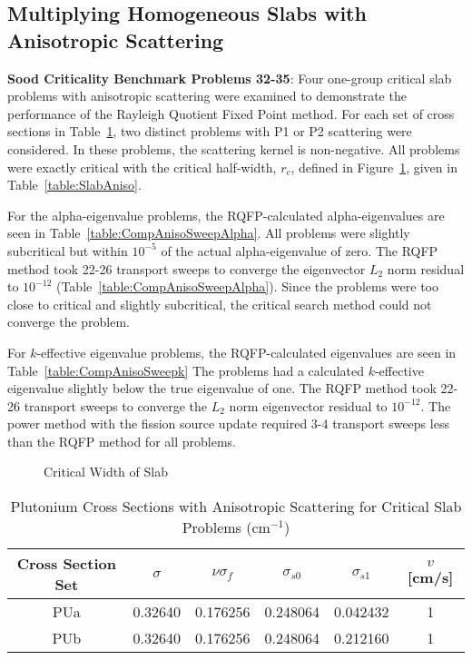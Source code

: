 \subsection{Multiplying Homogeneous Slabs with Anisotropic Scattering}

\textbf{Sood Criticality Benchmark Problems 32-35}: Four one-group critical slab problems with anisotropic scattering were examined to demonstrate the performance of the Rayleigh Quotient Fixed Point method. For each set of cross sections in Table~\ref{table:SoodPUAniso}, two distinct problems with P1 or P2 scattering were considered. In these problems, the scattering kernel is non-negative. All problems were exactly critical with the critical half-width, $r_{c}$, defined in Figure~\ref{fig:SlabCritWidth}, given in Table~\ref{table:SlabAniso}.

For the alpha-eigenvalue problems, the RQFP-calculated alpha-eigenvalues are seen in Table~\ref{table:CompAnisoSweepAlpha}. All problems were slightly subcritical but within $10^{-5}$ of the actual alpha-eigenvalue of zero. The RQFP method took 22-26 transport sweeps to converge the eigenvector $L_{2}$ norm residual to $10^{-12}$ (Table~\ref{table:CompAnisoSweepAlpha}). Since the problems were too close to critical and slightly subcritical, the critical search method could not converge the problem.

For $k$-effective eigenvalue problems, the RQFP-calculated eigenvalues are seen in Table~\ref{table:CompAnisoSweepk} The problems had a calculated $k$-effective eigenvalue slightly below the true eigenvalue of one. The RQFP method took 22-26 transport sweeps to converge the $L_{2}$ norm eigenvector residual to $10^{-12}$. The power method with the fission source update required 3-4 transport sweeps less than the RQFP method for all problems.

\begin{figure}[!htbp]
	\centering
	
	\caption{Critical Width of Slab}
	\label{fig:SlabCritWidth}
\end{figure}

\begin{table}[!htbp]
	\caption{Plutonium Cross Sections with Anisotropic Scattering for Critical Slab Problems (cm$^{-1}$) \cite{sood2003analytical}}
	\label{table:SoodPUAniso}
	\centering{}
    \begin{tabular}{*6c}
        \toprule
	Cross Section Set & $\sigma$ & $\nu \sigma_{f}$ & $\sigma_{s0}$  & $\sigma_{s1}$ & $v$ [cm/s] \\ 
        \midrule
	PUa & 0.32640 & 0.176256 & 0.248064 & 0.042432 & 1 \\
	PUb & 0.32640 & 0.176256 & 0.248064 & 0.212160 & 1 \\
        \bottomrule
    \end{tabular}
\end{table}

